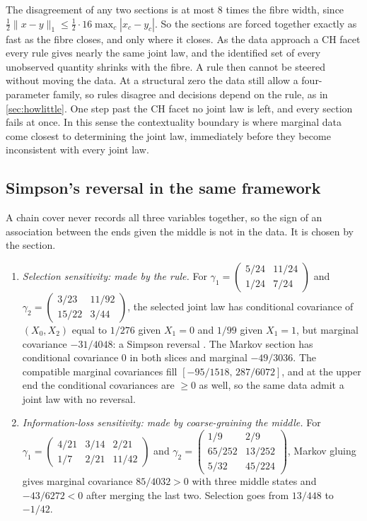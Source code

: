 \documentclass[11pt]{article}
\theoremstyle{definition}\newtheorem{definition}[theorem]{Definition}\newtheorem{remark}[theorem]{Remark}\newtheorem{example}[theorem]{Example}\newtheorem{problem}[theorem]{Open problem}\crefname{problem}{Problem}{Problems}
\begin{document}
The disagreement of any two sections is at most $8$ times the fibre width, since $\tfrac12\|x-y\|_1\le\tfrac12\cdot16\max_c|x_c-y_c|$. So the sections are forced together exactly as fast as the fibre closes, and only where it closes. As the data approach a CH facet every rule gives nearly the same joint law, and the identified set of every unobserved quantity shrinks with the fibre. A rule then cannot be steered without moving the data. At a structural zero the data still allow a four-parameter family, so rules disagree and decisions depend on the rule, as in \cref{sec:howlittle}. One step past the CH facet no joint law is left, and every section fails at once. In this sense the contextuality boundary is where marginal data come closest to determining the joint law, immediately before they become inconsistent with every joint law.

\subsection{Simpson's reversal in the same framework}\label{sec:simpson}
A chain cover never records all three variables together, so the sign of an association between the ends given the middle is not in the data. It is chosen by the section.

\begin{proposition}\label{prop:simpson}
\begin{enumerate}
\item[(1)] \emph{Selection sensitivity: made by the rule.} For $\gamma_1=\left(\begin{smallmatrix}5/24&11/24\\1/24&7/24\end{smallmatrix}\right)$ and $\gamma_2=\left(\begin{smallmatrix}3/23&11/92\\15/22&3/44\end{smallmatrix}\right)$, the selected joint law has conditional covariance of $(X_0,X_2)$ equal to $1/276$ given $X_1=0$ and $1/99$ given $X_1=1$, but marginal covariance $-31/4048$: a Simpson reversal \cite{Simpson1951}. The Markov section has conditional covariance $0$ in both slices and marginal $-49/3036$. The compatible marginal covariances fill $[-95/1518,\,287/6072]$, and at the upper end the conditional covariances are $\ge0$ as well, so the same data admit a joint law with no reversal.
\item[(2)] \emph{Information-loss sensitivity: made by coarse-graining the middle.} For $\gamma_1=\left(\begin{smallmatrix}4/21&3/14&2/21\\1/7&2/21&11/42\end{smallmatrix}\right)$ and $\gamma_2=\left(\begin{smallmatrix}1/9&2/9\\65/252&13/252\\5/32&45/224\end{smallmatrix}\right)$, Markov gluing gives marginal covariance $85/4032>0$ with three middle states and $-43/6272<0$ after merging the last two. Selection goes from $13/448$ to $-1/42$.
\end{enumerate}
\end{proposition}
\end{document}
